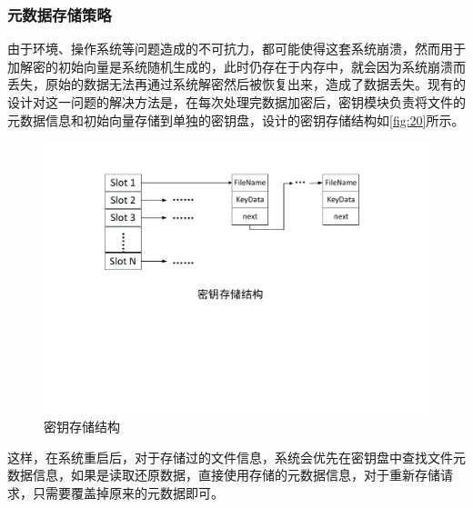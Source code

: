 \subsubsection{元数据存储策略}
由于环境、操作系统等问题造成的不可抗力，都可能使得这套系统崩溃，然而用于加解密的初始向量是系统随机生成的，此时仍存在于内存中，就会因为系统崩溃而丢失，原始的数据无法再通过系统解密然后被恢复出来，造成了数据丢失。现有的设计对这一问题的解决方法是，在每次处理完数据加密后，密钥模块负责将文件的元数据信息和初始向量存储到单独的密钥盘，设计的密钥存储结构如\autoref{fig:20}所示。
\begin{figure}[htb]
	\centering
	\includegraphics[width=1\textwidth]{Pics/keystore.pdf}
	\caption{密钥存储结构}
	\label{fig:20}
\end{figure}
这样，在系统重启后，对于存储过的文件信息，系统会优先在密钥盘中查找文件元数据信息，如果是读取还原数据，直接使用存储的元数据信息，对于重新存储请求，只需要覆盖掉原来的元数据即可。
